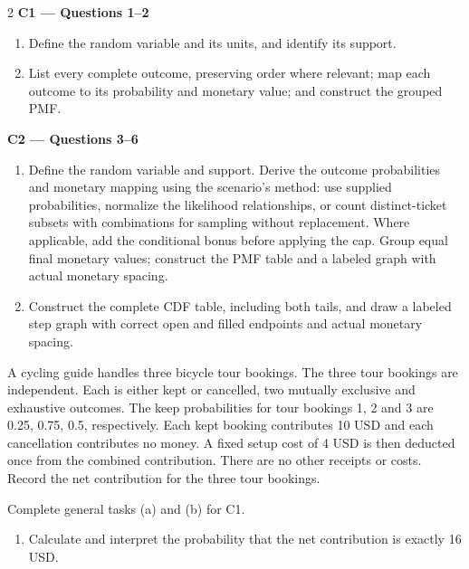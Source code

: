 \begin{multicols*}{2}
\textbf{C1 --- Questions 1--2}
\begin{enumerate}[label=(\alph*)]
\item Define the random variable and its units, and identify its support.
\item List every complete outcome, preserving order where relevant; map each outcome to its probability and monetary value; and construct the grouped PMF.
\end{enumerate}
\noindent\begin{minipage}{\linewidth}
\textbf{C2 --- Questions 3--6}
\begin{enumerate}[label=(\alph*)]
\item Define the random variable and support. Derive the outcome probabilities and monetary mapping using the scenario's method: use supplied probabilities, normalize the likelihood relationships, or count distinct-ticket subsets with combinations for sampling without replacement. Where applicable, add the conditional bonus before applying the cap. Group equal final monetary values; construct the PMF table and a labeled graph with actual monetary spacing.
\item Construct the complete CDF table, including both tails, and draw a labeled step graph with correct open and filled endpoints and actual monetary spacing.
\end{enumerate}
\end{minipage}\par

\noindent\begin{minipage}{\linewidth}
A cycling guide handles three bicycle tour bookings. The three tour bookings are independent. Each is either kept or cancelled, two mutually exclusive and exhaustive outcomes. The keep probabilities for tour bookings 1, 2 and 3 are 0.25, 0.75, 0.5, respectively. Each kept booking contributes 10 USD and each cancellation contributes no money. A fixed setup cost of 4 USD is then deducted once from the combined contribution. There are no other receipts or costs. Record the net contribution for the three tour bookings.

Complete general tasks (a)  and (b)  for C1.
\begin{enumerate}[label=(\alph*),start=3]
\item {} Calculate and interpret the probability that the net contribution is exactly 16 USD.
\end{enumerate}
\end{minipage}\par\medskip


\end{multicols*}
